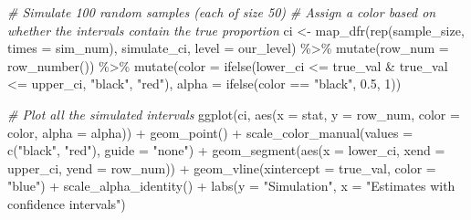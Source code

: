\documentclass[
]{book}
\newenvironment{Shaded}{\begin{snugshade}}{\end{snugshade}}
\newcommand{\AttributeTok}[1]{\textcolor[rgb]{0.77,0.63,0.00}{#1}}
\newcommand{\CommentTok}[1]{\textcolor[rgb]{0.56,0.35,0.01}{\textit{#1}}}
\newcommand{\DecValTok}[1]{\textcolor[rgb]{0.00,0.00,0.81}{#1}}
\newcommand{\FloatTok}[1]{\textcolor[rgb]{0.00,0.00,0.81}{#1}}
\newcommand{\FunctionTok}[1]{\textcolor[rgb]{0.00,0.00,0.00}{#1}}
\newcommand{\NormalTok}[1]{#1}
\newcommand{\OtherTok}[1]{\textcolor[rgb]{0.56,0.35,0.01}{#1}}
\newcommand{\SpecialCharTok}[1]{\textcolor[rgb]{0.00,0.00,0.00}{#1}}
\newcommand{\StringTok}[1]{\textcolor[rgb]{0.31,0.60,0.02}{#1}}
\begin{document}
\begin{Shaded}
\begin{Highlighting}[]
\CommentTok{\# Simulate 100 random samples (each of size 50)}
\CommentTok{\# Assign a color based on whether the intervals contain the true proportion}
\NormalTok{ci }\OtherTok{\textless{}{-}} \FunctionTok{map\_dfr}\NormalTok{(}\FunctionTok{rep}\NormalTok{(sample\_size, }\AttributeTok{times =}\NormalTok{ sim\_num), simulate\_ci, }\AttributeTok{level =}\NormalTok{ our\_level) }\SpecialCharTok{\%\textgreater{}\%}
    \FunctionTok{mutate}\NormalTok{(}\AttributeTok{row\_num =} \FunctionTok{row\_number}\NormalTok{()) }\SpecialCharTok{\%\textgreater{}\%}
    \FunctionTok{mutate}\NormalTok{(}\AttributeTok{color =} \FunctionTok{ifelse}\NormalTok{(lower\_ci }\SpecialCharTok{\textless{}=}\NormalTok{ true\_val }\SpecialCharTok{\&}\NormalTok{ true\_val }\SpecialCharTok{\textless{}=}\NormalTok{ upper\_ci,}
                          \StringTok{"black"}\NormalTok{, }\StringTok{"red"}\NormalTok{),}
           \AttributeTok{alpha =} \FunctionTok{ifelse}\NormalTok{(color }\SpecialCharTok{==} \StringTok{"black"}\NormalTok{, }\FloatTok{0.5}\NormalTok{, }\DecValTok{1}\NormalTok{))}

\CommentTok{\# Plot all the simulated intervals}
\FunctionTok{ggplot}\NormalTok{(ci, }\FunctionTok{aes}\NormalTok{(}\AttributeTok{x =}\NormalTok{ stat, }\AttributeTok{y =}\NormalTok{ row\_num,}
                   \AttributeTok{color =}\NormalTok{ color, }\AttributeTok{alpha =}\NormalTok{ alpha)) }\SpecialCharTok{+}
    \FunctionTok{geom\_point}\NormalTok{() }\SpecialCharTok{+}
    \FunctionTok{scale\_color\_manual}\NormalTok{(}\AttributeTok{values =} \FunctionTok{c}\NormalTok{(}\StringTok{"black"}\NormalTok{, }\StringTok{"red"}\NormalTok{), }\AttributeTok{guide =} \StringTok{"none"}\NormalTok{) }\SpecialCharTok{+}
    \FunctionTok{geom\_segment}\NormalTok{(}\FunctionTok{aes}\NormalTok{(}\AttributeTok{x =}\NormalTok{ lower\_ci, }\AttributeTok{xend =}\NormalTok{ upper\_ci, }\AttributeTok{yend =}\NormalTok{ row\_num)) }\SpecialCharTok{+}
    \FunctionTok{geom\_vline}\NormalTok{(}\AttributeTok{xintercept =}\NormalTok{ true\_val, }\AttributeTok{color =} \StringTok{"blue"}\NormalTok{) }\SpecialCharTok{+}
    \FunctionTok{scale\_alpha\_identity}\NormalTok{() }\SpecialCharTok{+}
    \FunctionTok{labs}\NormalTok{(}\AttributeTok{y =} \StringTok{"Simulation"}\NormalTok{, }\AttributeTok{x =} \StringTok{"Estimates with confidence intervals"}\NormalTok{)}
\end{Highlighting}
\end{Shaded}
\end{document}
